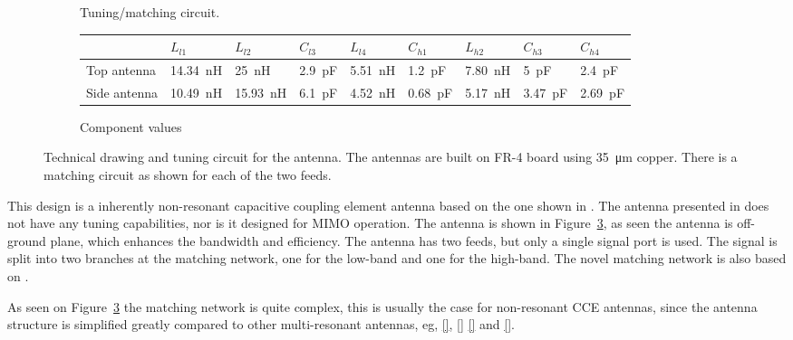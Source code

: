 \begin{figure}[htbp]
\begin{subfigure}[b]{0.49\linewidth}
        \caption{Tuning/matching circuit.}
        \label{fig:ant3schematic}
    \end{subfigure}
    \par\bigskip
        \begin{subfigure}[b]{\linewidth}
        \centering
        \begin{tabular}{|l|l|l|l|l|l|l|l|l|}
            \hline
                         & $L_{l1}$       & $L_{l2}$        & $C_{l3}$      & $L_{l4}$       & $C_{h1}$       & $L_{h2}$      & $C_{h3}$      & $C_{h4}$    \\
            \hline
            Top antenna  & \SI{14,34}{nH}  & \SI{25}{nH}  & \SI{2,9}{pF} & \SI{5,51}{nH} & \SI{1,2}{pF} & \SI{7,80}{nH} & \SI{5}{pF} & \SI{2.4}{pF} \\
            Side antenna & \SI{10,49}{nH}  & \SI{15,93}{nH}  & \SI{6.1}{pF} & \SI{4.52}{nH} & \SI{0.68}{pF} & \SI{5.17}{nH} & \SI{3.47}{pF} & \SI{2.69}{pF} \\
            \hline
        \end{tabular}
        \caption{Component values}
        \label{fig:ant3schematic}
    \end{subfigure}

    \caption{Technical drawing and tuning circuit for the antenna.  The antennas are built on FR-4 board using \SI{35}{\micro\meter} copper. There is a matching circuit as shown for each of the two feeds.}
    \label{fig:ant3techschem}
\end{figure}


This design is a inherently non-resonant capacitive coupling element antenna based on the one shown in \cite{valkonen2013inherently}. The antenna presented in \cite{valkonen2013inherently} does not have any tuning capabilities, nor is it designed for MIMO operation. The antenna is shown in Figure~\ref{fig:ant3techschem}, as seen the antenna is off-ground plane, which enhances the bandwidth and efficiency. The antenna has two feeds, but only a single signal port is used. The signal is split into two branches at the matching network, one for the low-band and one for the high-band. The novel matching network is also based on \cite{valkonen2013inherently}.

As seen on Figure~\ref{fig:ant3techschem} the matching network is quite complex, this is usually the case for non-resonant CCE antennas, since the antenna structure is simplified greatly compared to other multi-resonant antennas, eg, \ref{}, \ref{} \ref{} and \ref{}. 


